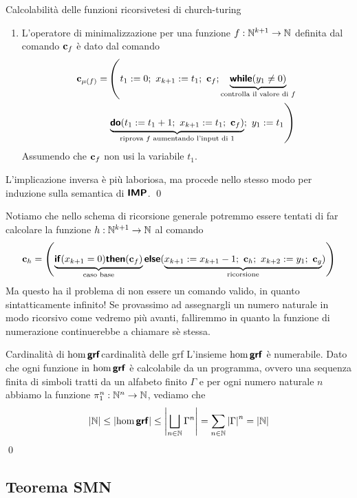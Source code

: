 \documentclass[openany]{book}
\begin{document}
\begin{theorem}{Calcolabilità delle funzioni ricorsive}{tesi di church-turing}
\begin{enumerate}
        Assumendo che la variabile $t_1$ non sia usata nè da $\c_f$ nè da $\c_g$
        \item L'operatore di minimalizzazione per una funzione $ f:\mathbb{N}^{k+1}\to \mathbb{N} $ definita dal comando $\c_f$ è dato dal comando 
        \begin{align*}
            \c_{\mu(f)} = & \left( t_1 := 0;\ x_{k+1}:= t_1;\ \c_f ;\underbrace{\while(y_1 \neq 0)}_{\text{controlla il valore di }f} \right. \\
            &\left. \underbrace{\doc( t_1:= t_1+1;\ x_{k+1} := t_1;\ \c_f )}_{\text{riprova }f\text{ aumentando l'input di }1};\ y_1 := t_1 \right)
        \end{align*}
        Assumendo che $\c_f$ non usi la variabile $t_1$.
    \end{enumerate}
    L'implicazione inversa è più laboriosa, ma procede nello stesso modo per induzione sulla semantica di $\text{\sffamily\textbf{IMP}}$. 
    \qed 
\end{theorem}

Notiamo che nello schema di ricorsione generale potremmo essere tentati di far calcolare la funzione $h:\mathbb{N}^{k+1}\to\mathbb{N}$ al comando
\[ \mathbf{c}_h = \left(\underbrace{\text{\sffamily\textbf{if}}(x_{k+1} = 0)\text{\sffamily\textbf{then}}(\mathbf{c}_f)}_{\text{caso base}}\text{\sffamily\textbf{else}}(\underbrace{x_{k+1} := x_{k+1} - 1 ;\ \mathbf{c}_h ;\ x_{k+2} := y_1 ;\ \mathbf{c}_g }_{\text{ricorsione}}) \right) \]
Ma questo ha il problema di non essere un comando valido, in quanto sintatticamente infinito! Se provassimo ad assegnargli un numero naturale in modo ricorsivo come vedremo più avanti, falliremmo in quanto la funzione di numerazione continuerebbe a chiamare sè stessa.

\begin{corollary}{Cardinalità di $\hom\text{\sffamily\textbf{grf}}$}{cardinalità delle grf}
    L'insieme $\hom\text{\sffamily\textbf{grf}}$ è numerabile.
    \proof
    Dato che ogni funzione in $\hom\text{\sffamily\textbf{grf}}$ è calcolabile da un programma, ovvero una sequenza finita di simboli tratti da un alfabeto finito $\Gamma$ e per ogni numero naturale $n$ abbiamo la funzione $\pi_1^n : \mathbb{N}^n\to \mathbb{N}$, vediamo che 
    \[ \left|\mathbb{N}\right| \le \left| \hom\text{\sffamily\textbf{grf}} \right| \le \left| \bigsqcup_{n \in \mathbb{N}} \Gamma^n \right| = \sum_{n \in \mathbb{N}}\left|\Gamma\right|^n = \left|\mathbb{N}\right| \]
    \qed
\end{corollary}

\newcommand\pair{\operatorname{pair}}
\newcommand\smnk{\catname{Smnk}}

\subsection{Teorema SMN}
\end{document}
